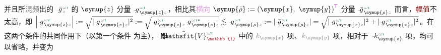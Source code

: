 并且所\textcolor{gray}{混频}出的 $\Xint{{}^{}_{\mathcolor{gray}{-}}}{10}{\bar{g}}^{\;\!\mathcolor{gray}{\omega} \textcolor{PineGreen}{\imath}}_{\;\! \mathcolor{gray}{z}}$ 的 $\symup{z}$ 分量 $\Xint{{}^{}_{\mathcolor{gray}{-}}}{10}{g}^{\;\!\mathcolor{gray}{\omega} \textcolor{PineGreen}{\imath}}_{\;\! \symup{z} \mathcolor{gray}{z}}$，相比其\textcolor{Plum}{横向} $\symup{\bar{\rho}} := \left( \symup{x},~ \symup{y} \right)^{\mathsf{\textcolor{Plum}{T}}}$ 分量 $\Xint{{}^{}_{\mathcolor{gray}{-}}}{10}{\bar{g}}^{\;\!\mathcolor{gray}{\omega} \textcolor{PineGreen}{\imath}}_{\;\! \symup{\rho} \mathcolor{gray}{z}}$ 而言，\textcolor{Maroon}{幅值}不太高，即 $\left| \Xint{{}^{}_{\mathcolor{gray}{-}}}{10}{g}^{\;\!\mathcolor{gray}{\omega} \textcolor{PineGreen}{\imath}}_{\;\! \symup{z} \mathcolor{gray}{z}} \right| := \sqrt{ \lvert \Xint{{}^{}_{\mathcolor{gray}{-}}}{10}{g}^{\;\!\mathcolor{gray}{\omega} \textcolor{PineGreen}{\imath}}_{\;\! \symup{z} \mathcolor{gray}{z}} \rvert^2 } := \sqrt{ \Xint{{}^{}_{\mathcolor{gray}{-}}}{10}{g}^{\;\!\mathcolor{gray}{\omega} \textcolor{PineGreen}{\imath}}_{\;\! \symup{z} \mathcolor{gray}{z}} \Xint{{}^{}_{\mathcolor{gray}{-}}}{10}{g}^{\;\!\mathcolor{gray}{\omega} \textcolor{PineGreen}{\imath} *}_{\;\! \symup{z} \mathcolor{gray}{z}} } \lesssim \Xint{{}^{}_{\mathcolor{gray}{-}}}{10}{g}^{\;\!\mathcolor{gray}{\omega} \textcolor{PineGreen}{\imath}}_{\;\! \symup{\rho} \mathcolor{gray}{z}} := \lvert \Xint{{}^{}_{\mathcolor{gray}{-}}}{10}{\bar{g}}^{\;\!\mathcolor{gray}{\omega} \textcolor{PineGreen}{\imath}}_{\;\! \symup{\rho} \mathcolor{gray}{z}} \rvert = \sqrt{ \lvert \Xint{{}^{}_{\mathcolor{gray}{-}}}{10}{g}^{\;\! \mathcolor{gray}{\omega} \textcolor{PineGreen}{\imath}}_{\;\! \symup{x} \mathcolor{gray}{z}} \rvert^2 + \lvert \Xint{{}^{}_{\mathcolor{gray}{-}}}{10}{g}^{\;\! \mathcolor{gray}{\omega} \textcolor{PineGreen}{\imath}}_{\;\! \symup{x} \mathcolor{gray}{z}} \rvert^2 }$。在这两个条件的共同作用下（以第一个条件  为主）， 即 $\Xint{\mathcolor{gray}{-}}{25}{\bar{\bar{\mathsfit{V}}}}^{\;\! \mathcolor{gray}{\omega} \textcolor{PineGreen}{\imath}}_{\textcolor{Maroon}{\mathbb{1}}}$ 中的 $\mathcolor{gray}{k_{\symup{x}}}$ 项、$\mathcolor{gray}{k_{\symup{y}}}$ 项，相对于 $\Xint{\begin{smallmatrix} ~ \\ {}^{}_{\mathcolor{gray}{-}} \\ ~ \end{smallmatrix}}{15}{k}_{\symup{z}}^{\;\! \mathcolor{gray}{\omega} \textcolor{PineGreen}{\imath}}$ 项，均可以省略，并变为

